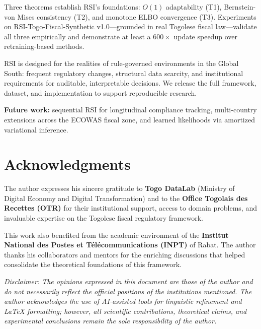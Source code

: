 \documentclass[letterpaper]{article}
\begin{document}
Three theorems establish RSI's foundations: $O(1)$ adaptability (T1),
Bernstein-von Mises consistency (T2), and monotone ELBO convergence
(T3). Experiments on RSI-Togo-Fiscal-Synthetic v1.0---grounded in
real Togolese fiscal law---validate all three empirically and
demonstrate at least a $600\times$ update speedup over retraining-based
methods.

RSI is designed for the realities of rule-governed environments in
the Global South: frequent regulatory changes, structural data scarcity,
and institutional requirements for auditable, interpretable decisions.
We release the full framework, dataset, and implementation to support
reproducible research.

\medskip
\noindent\textbf{Future work:} sequential RSI for longitudinal
compliance tracking, multi-country extensions across the ECOWAS fiscal
zone, and learned likelihoods via amortized variational inference.

\section*{Acknowledgments}

The author expresses his sincere gratitude to \textbf{Togo DataLab} (Ministry of Digital Economy and Digital Transformation) and to the \textbf{Office Togolais des Recettes (OTR)} for their institutional support, access to domain problems, and invaluable expertise on the Togolese fiscal regulatory framework. 

This work also benefited from the academic environment of the \textbf{Institut National des Postes et T\'el\'ecommunications (INPT)} of Rabat. The author thanks his collaborators and mentors for the enriching discussions that helped consolidate the theoretical foundations of this framework.

\smallskip
\noindent\textit{Disclaimer: The opinions expressed in this document are those of the author and do not necessarily reflect the official positions of the institutions mentioned. The author acknowledges the use of AI-assisted tools for linguistic refinement and \LaTeX{} formatting; however, all scientific contributions, theoretical claims, and experimental conclusions remain the sole responsibility of the author.}
\end{document}
